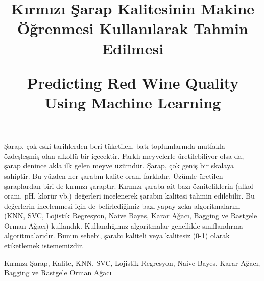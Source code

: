\documentclass[conference]{IEEEtran}
\begin{document}
\IEEEpubid{\makebox[\columnwidth]{\hfill} \hspace{\columnsep}\makebox[\columnwidth]{}}

\title{Kırmızı Şarap Kalitesinin Makine Öğrenmesi Kullanılarak Tahmin Edilmesi
\\
\*

Predicting Red Wine Quality Using Machine Learning
}
\author{
	
\and
{}
}
\maketitle
\thispagestyle{plain}
\pagestyle{plain}
\begin{ozet}
Şarap, çok eski tarihlerden beri tüketilen, batı toplumlarında mutfakla özdeşleşmiş olan alkollü bir içecektir. Farklı meyvelerle üretilebiliyor olsa da, şarap denince akla ilk gelen meyve üzümdür. Şarap, çok geniş bir skalaya sahiptir. Bu yüzden her şarabın kalite oranı farklıdır. Üzümle üretilen şaraplardan biri de kırmızı şaraptır. Kırmızı şaraba ait bazı özniteliklerin (alkol oranı, pH, klorür vb.) değerleri incelenerek şarabın kalitesi tahmin edilebilir. Bu değerlerin incelenmesi için de belirlediğimiz bazı yapay zeka algoritmalarını (KNN, SVC, Lojistik Regresyon, Naive Bayes, Karar Ağacı, Bagging ve Rastgele Orman Ağacı) kullandık. Kullandığımız algoritmalar genellikle sınıflandırma algoritmalarıdır. Bunun sebebi, şarabı kaliteli veya kalitesiz (0-1) olarak etiketlemek istememizdir.
\end{ozet}

\begin{IEEEanahtar}
Kırmızı Şarap, Kalite, KNN, SVC, Lojistik Regresyon, Naive Bayes, Karar Ağacı, Bagging ve Rastgele Orman Ağacı
\end{IEEEanahtar}
\end{document}
